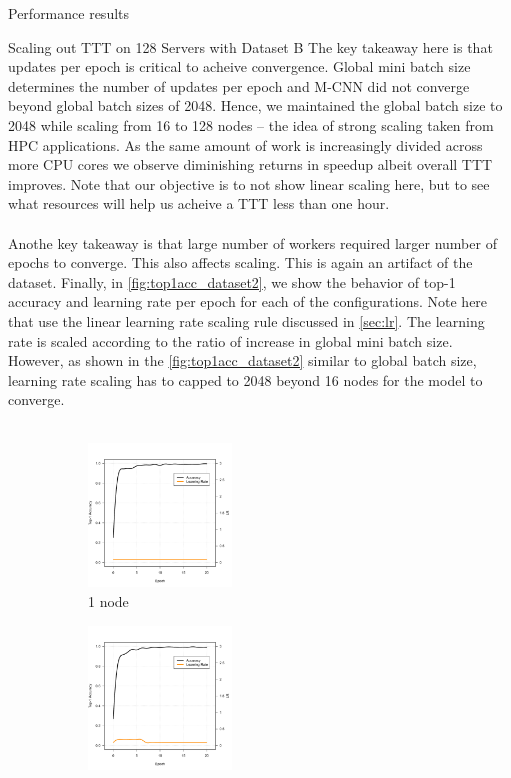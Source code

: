 \begin{section}{Performance results}
\begin{subsection}{Scaling out TTT on 128 Servers with Dataset B}
\noindent The key takeaway here is that updates per epoch is critical to acheive convergence. Global mini batch size determines the number of updates per epoch and M-CNN did not converge beyond global batch sizes of 2048. Hence, we maintained the global batch size to 2048 while scaling from 16 to 128 nodes -- the idea of strong scaling taken from HPC applications. As the same amount of work is increasingly divided across more CPU cores we observe diminishing returns in speedup albeit overall TTT improves. Note that our objective is to not show linear scaling here, but to see what resources will help us acheive a TTT less than one hour. \\\\
\noindent Anothe key takeaway is that large number of workers required larger number of epochs to converge. This also affects scaling. This is again an artifact of the dataset. Finally, in \autoref{fig:top1acc_dataset2}, we show the behavior of top-1 accuracy and learning rate per epoch for each of the configurations. Note here that use the linear learning rate scaling rule discussed in \autoref{sec:lr}. The learning rate is scaled according to the ratio of increase in global mini batch size. However, as shown in the \autoref{fig:top1acc_dataset2} similar to global batch size, learning rate scaling has to capped to 2048 beyond 16 nodes for the model to converge. \\\\
		\begin{figure}[t!]
			\centering
			\begin{subfigure}[b]{0.25\textwidth}
				\includegraphics[width=1.5in]{figure7a.pdf}
			\caption{1 node}
			\end{subfigure}%
			\begin{subfigure}[b]{0.25\textwidth}
				\includegraphics[height=1.5in]{figure7b.pdf}

\end{subfigure}
\end{figure}
\end{subsection}
\end{section}
